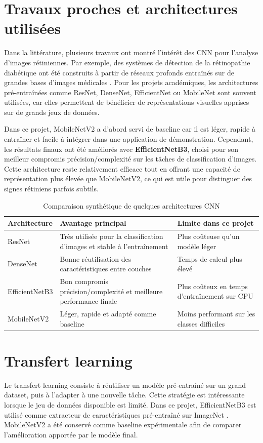 \documentclass[12pt,a4paper]{report}
\begin{document}
\section{Travaux proches et architectures utilisées}
Dans la littérature, plusieurs travaux ont montré l'intérêt des CNN pour l'analyse d'images rétiniennes. Par exemple, des systèmes de détection de la rétinopathie diabétique ont été construits à partir de réseaux profonds entraînés sur de grandes bases d'images médicales \cite{gulshan2016}. Pour les projets académiques, les architectures pré-entraînées comme ResNet, DenseNet, EfficientNet ou MobileNet sont souvent utilisées, car elles permettent de bénéficier de représentations visuelles apprises sur de grands jeux de données.

Dans ce projet, MobileNetV2 a d'abord servi de baseline car il est léger, rapide à entraîner et facile à intégrer dans une application de démonstration. Cependant, les résultats finaux ont été améliorés avec \textbf{EfficientNetB3}, choisi pour son meilleur compromis précision/complexité sur les tâches de classification d'images. Cette architecture reste relativement efficace tout en offrant une capacité de représentation plus élevée que MobileNetV2, ce qui est utile pour distinguer des signes rétiniens parfois subtils.

\begin{table}[H]
\centering
\caption{Comparaison synthétique de quelques architectures CNN}
\label{tab:architectures}
\begin{tabularx}{\textwidth}{lXX}
\toprule
Architecture & Avantage principal & Limite dans ce projet \\
\midrule
ResNet & Très utilisée pour la classification d'images et stable à l'entraînement & Plus coûteuse qu'un modèle léger \\
DenseNet & Bonne réutilisation des caractéristiques entre couches & Temps de calcul plus élevé \\
EfficientNetB3 & Bon compromis précision/complexité et meilleure performance finale & Plus coûteux en temps d'entraînement sur CPU \\
MobileNetV2 & Léger, rapide et adapté comme baseline & Moins performant sur les classes difficiles \\
\bottomrule
\end{tabularx}
\end{table}

\section{Transfert learning}
Le transfert learning consiste à réutiliser un modèle pré-entraîné sur un grand dataset, puis à l'adapter à une nouvelle tâche. Cette stratégie est intéressante lorsque le jeu de données disponible est limité. Dans ce projet, EfficientNetB3 est utilisé comme extracteur de caractéristiques pré-entraîné sur ImageNet \cite{tan2019}. MobileNetV2 a été conservé comme baseline expérimentale afin de comparer l'amélioration apportée par le modèle final.
\end{document}
